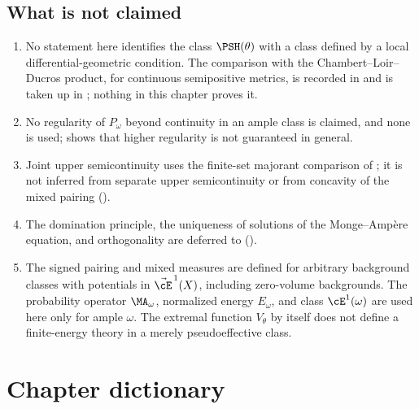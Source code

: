 \subsection{What is not claimed}
\label{sec:ch46-not-claimed}

\begin{enumerate}
\item No statement here identifies the class $\PSH(\theta)$ with a class
      defined by a local differential-geometric condition.  The comparison
      with the Chambert--Loir--Ducros product, for continuous semipositive
      metrics, is recorded in \cite[Remark~7.23]{BJ22} and is taken up in
      ; nothing in this chapter proves it.
\item No regularity of $P_\omega$ beyond continuity in an ample class is
      claimed, and none is used;  shows that
      higher regularity is not guaranteed in general.
\item Joint upper semicontinuity uses the finite-set majorant comparison
      of \cite[Lemma~4.26]{BJ22}; it is not inferred from separate upper
      semicontinuity or from concavity of the mixed pairing
      ().
\item The domination principle, the uniqueness of solutions of the
      Monge--Amp\`ere equation, and orthogonality are deferred to
       ().
\item The signed pairing and mixed measures are defined for arbitrary
      background classes with potentials in $\vec\cE^{\,1}(X)$, including
      zero-volume backgrounds. The probability operator $\MA_\omega$,
      normalized energy $E_\omega$, and class $\cE^1(\omega)$ are used
      here only for ample $\omega$. The extremal function $V_\theta$ by
      itself does not define a finite-energy theory in a merely
      pseudoeffective class.
\end{enumerate}

\section{Chapter dictionary}
\label{sec:ch46-dictionary}

